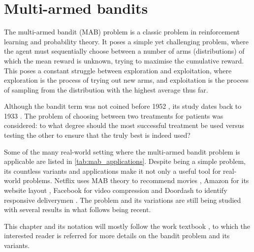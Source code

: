 \chapter{Multi-armed bandits}
\label{chap:bandits}

The multi-armed bandit (MAB) problem is a classic problem in reinforcement learning and probability theory.
It poses a simple yet challenging problem, where the agent must sequentially choose between a number of arms (distributions) of which the mean reward is unknown, trying to maximise the cumulative reward.
This poses a constant struggle between exploration and exploitation, where exploration is the process of trying out new arms, and exploitation is the process of sampling from the distribution with the highest average thus far.

Although the bandit term was not coined before 1952 \autocite{robbins1952}, its study dates back to 1933 \autocite{thompson1933}.
The problem of choosing between two treatments for patients was considered: to what degree should the most successful treatment be used versus testing the other to ensure that the truly best is indeed used?

Some of the many real-world setting where the multi-armed bandit problem is applicable are listed in \cref{tab:mab_applications}.
Despite being a simple problem, its countless variants and applications make it not only a useful tool for real-world problems.
Netflix uses MAB theory to recommend movies \autocite{kawale2018}, Amazon for its website layout \autocite{hill2017}, Facebook for video compression \autocite{daulton2019} and Doordash to identify responsive deliverymen \autocite{sharma2022}.
The problem and its variations are still being studied with several results in what follows being recent.

This chapter and its notation will mostly follow the work textbook \autocite{lattimore2020}, to which the interested reader is referred for more details on the bandit problem and its variants.


